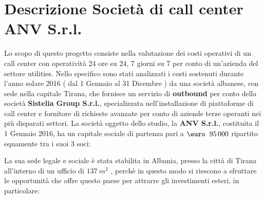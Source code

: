 \chapter{Descrizione Società di call center \ac{ANV S.r.l.}}
Lo scopo di questo progetto consiste nella valutazione dei costi operativi di un call center con operatività 24 ore su 24, 7 giorni su 7 per conto di un'azienda del settore utilities. \newline
Nello specifico sono stati analizzati i costi sostenuti durante l'anno solare 2016 ( dal 1 Gennaio al 31 Dicembre ) da una società albanese, con sede nella capitale Tirana, che fornisce un servizio di \textbf{outbound} per conto della società \textbf{Sistelia Group S.r.l.}, specializzata nell'installazione di piattaforme di call center e fornitore di richieste avanzate per conto di aziende terze operanti nei più disparati settori. \newline
La società oggetto dello studio, la \textbf{\ac{ANV S.r.l.}}, costituita il 1 Gennaio 2016, ha un capitale sociale di partenza pari a $\mbox{\euro \:95\thinspace 000}$ ripartito equamente tra i suoi 3 soci:

\newpage
La sua sede legale e sociale è stata stabilita in Albania, presso la città di Tirana all'interno di un ufficio di $ 137 \: m^2 $ \cite{Ufficio}, perchè in questo modo si riescono a sfruttare le opportunità che offre questo paese per attrarre gli investimenti esteri, in particolare:
